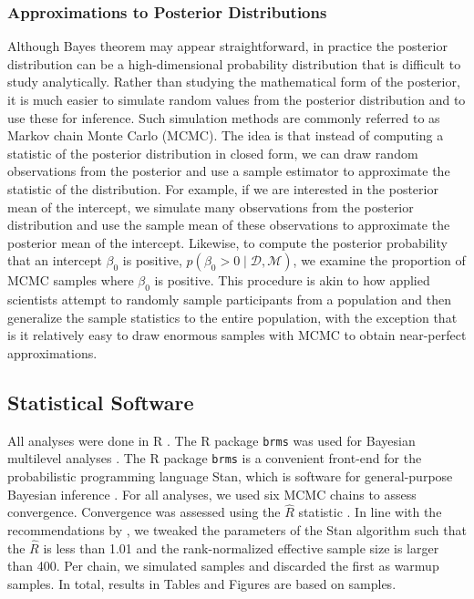 \documentclass[a4paper]{article}
\newcommand{\getValInt}[3]{%
	\pgfplotstablegetelem{#1}{#2}\of{#3}%
	\pgfmathprintnumber[fixed, fixed zerofill=false]{\pgfplotsretval}%
}
\newcommand{\code}[1]{\texttt{#1}}
\newcommand{\prob}[1]{p\left(#1\right)}
\newcommand{\data}{\mathcal{D}}
\newcommand{\model}{\mathcal{M}}
\begin{document}
\subsubsection*{Approximations to Posterior Distributions}
Although Bayes theorem may appear straightforward, in practice the posterior distribution can be a high-dimensional probability distribution that is difficult to study analytically. Rather than studying the mathematical form of the posterior, it is much easier to simulate random values from the posterior distribution and to use these for inference. Such simulation methods are commonly referred to as Markov chain Monte Carlo (MCMC). The idea is that instead of computing a statistic of the posterior distribution in closed form, we can draw random observations from the posterior and use a sample estimator to approximate the statistic of the distribution. For example, if we are interested in the posterior mean of the intercept, we simulate many observations from the posterior distribution and use the sample mean of these observations to approximate the posterior mean of the intercept. Likewise, to compute the posterior probability that an intercept $\beta_0$ is positive, $\prob{\beta_0 > 0 \mid \data , \model}$, we examine the proportion of MCMC samples where $\beta_0$ is positive. This procedure is akin to how applied scientists attempt to randomly sample participants from a population and then generalize the sample statistics to the entire population, with the exception that is it relatively easy to draw enormous samples with MCMC to obtain near-perfect approximations.

\subsection*{Statistical Software}
\tbMCMCsettings

All analyses were done in R \cite{R}. The R package \code{brms} was used for Bayesian multilevel analyses \cite{burkner2017brms}. The R package \code{brms} is a convenient front-end for the probabilistic programming language Stan, which is software for general-purpose Bayesian inference \cite{carpenter2017stan}. For all analyses, we used six MCMC chains to assess convergence. Convergence was assessed using the $\widehat{R}$ statistic \cite{vehtari2019rank}. In line with the recommendations by , we tweaked the parameters of the Stan algorithm such that the $\widehat{R}$ is less than 1.01 and the rank-normalized effective sample size is larger than 400. Per chain, we simulated \getValInt{0}{iter}{\tbMCMCsettings} samples and discarded the first \getValInt{0}{warmup}{\tbMCMCsettings} as warmup samples. In total, results in Tables and Figures are based on \getValInt{0}{total}{\tbMCMCsettings} samples.
\end{document}
